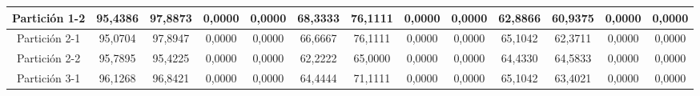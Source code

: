 \documentclass[12pt]{article}
\begin{document}
\begin{table}[H]
{\begin{tabular}{|c|cccc|cccc|cccc|}
Partición 1-2 & \multicolumn{1}{c|}{95,4386}                                                  & \multicolumn{1}{c|}{97,8873}                                                 & \multicolumn{1}{c|}{0,0000}  & 0,0000 & \multicolumn{1}{c|}{68,3333}                                                  & \multicolumn{1}{c|}{76,1111}                                                 & \multicolumn{1}{c|}{0,0000}  & 0,0000 & \multicolumn{1}{c|}{62,8866}                                                  & \multicolumn{1}{c|}{60,9375}                                                 & \multicolumn{1}{c|}{0,0000}  & 0,0000 \\ \hline
Partición 2-1 & \multicolumn{1}{c|}{95,0704}                                                  & \multicolumn{1}{c|}{97,8947}                                                 & \multicolumn{1}{c|}{0,0000}  & 0,0000 & \multicolumn{1}{c|}{66,6667}                                                  & \multicolumn{1}{c|}{76,1111}                                                 & \multicolumn{1}{c|}{0,0000}  & 0,0000 & \multicolumn{1}{c|}{65,1042}                                                  & \multicolumn{1}{c|}{62,3711}                                                 & \multicolumn{1}{c|}{0,0000}  & 0,0000 \\ \hline
Partición 2-2 & \multicolumn{1}{c|}{95,7895}                                                  & \multicolumn{1}{c|}{95,4225}                                                 & \multicolumn{1}{c|}{0,0000}  & 0,0000 & \multicolumn{1}{c|}{62,2222}                                                  & \multicolumn{1}{c|}{65,0000}                                                 & \multicolumn{1}{c|}{0,0000}  & 0,0000 & \multicolumn{1}{c|}{64,4330}                                                  & \multicolumn{1}{c|}{64,5833}                                                 & \multicolumn{1}{c|}{0,0000}  & 0,0000 \\ \hline
Partición 3-1 & \multicolumn{1}{c|}{96,1268}                                                  & \multicolumn{1}{c|}{96,8421}                                                 & \multicolumn{1}{c|}{0,0000}  & 0,0000 & \multicolumn{1}{c|}{64,4444}                                                  & \multicolumn{1}{c|}{71,1111}                                                 & \multicolumn{1}{c|}{0,0000}  & 0,0000 & \multicolumn{1}{c|}{65,1042}                                                  & \multicolumn{1}{c|}{63,4021}                                                 & \multicolumn{1}{c|}{0,0000}  & 0,0000 \\ \hline

\end{tabular}}
\end{table}
\end{document}
